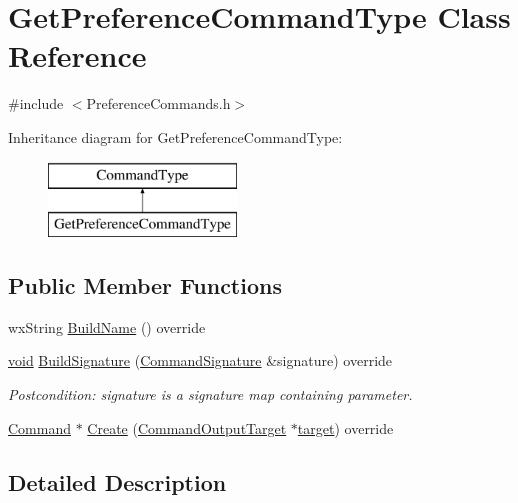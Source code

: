 \hypertarget{class_get_preference_command_type}{}\section{Get\+Preference\+Command\+Type Class Reference}
\label{class_get_preference_command_type}


{\ttfamily \#include $<$Preference\+Commands.\+h$>$}

Inheritance diagram for Get\+Preference\+Command\+Type\+:\begin{figure}[H]
\begin{center}
\leavevmode
\includegraphics[height=2.000000cm]{class_get_preference_command_type}
\end{center}
\end{figure}
\subsection*{Public Member Functions}
\begin{DoxyCompactItemize}
\item 
wx\+String \hyperlink{class_get_preference_command_type_afee137f553cb8f5273e89a7feed976ed}{Build\+Name} () override
\item 
\hyperlink{sound_8c_ae35f5844602719cf66324f4de2a658b3}{void} \hyperlink{class_get_preference_command_type_a706dd3d299afba391adf0a48ddd1a363}{Build\+Signature} (\hyperlink{class_command_signature}{Command\+Signature} \&signature) override
\begin{DoxyCompactList}\small\item\em Postcondition\+: signature is a \textquotesingle{}signature\textquotesingle{} map containing parameter. \end{DoxyCompactList}\item 
\hyperlink{class_command}{Command} $\ast$ \hyperlink{class_get_preference_command_type_ad7ebf7446e0dd390b94125845a10652b}{Create} (\hyperlink{class_command_output_target}{Command\+Output\+Target} $\ast$\hyperlink{lib_2expat_8h_a15a257516a87decb971420e718853137}{target}) override
\end{DoxyCompactItemize}


\subsection{Detailed Description}


